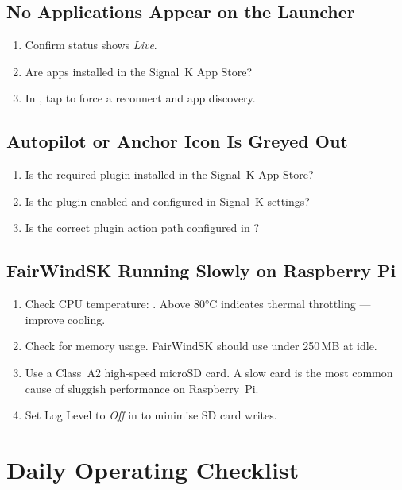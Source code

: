 \section{No Applications Appear on the Launcher}

\begin{enumerate}
  \item Confirm status shows \textit{Live}.
  \item Are apps installed in the Signal~K App Store?
  \item In , tap  to force a reconnect and
        app discovery.
\end{enumerate}

\section{Autopilot or Anchor Icon Is Greyed Out}

\begin{enumerate}
  \item Is the required plugin installed in the Signal~K App Store?
  \item Is the plugin enabled and configured in Signal~K settings?
  \item Is the correct plugin action path configured in
        ?
\end{enumerate}

\section{FairWindSK Running Slowly on Raspberry Pi}

\begin{enumerate}
  \item Check CPU temperature: .
        Above 80°C indicates thermal throttling --- improve cooling.
  \item Check  for memory usage.
        FairWindSK should use under 250\,MB at idle.
  \item Use a Class~A2 high-speed microSD card.
        A slow card is the most common cause of sluggish performance on Raspberry~Pi.
  \item Set Log Level to \textit{Off} in 
        to minimise SD card writes.
\end{enumerate}

\chapter{Daily Operating Checklist}
\label{ch:checklist}


